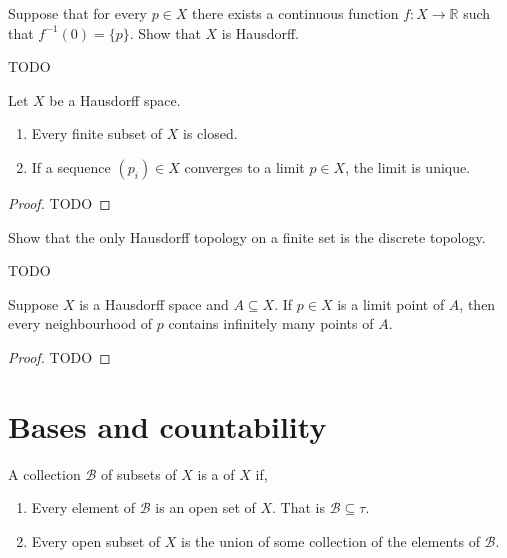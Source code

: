 \begin{exercise}
	\begin{problem}
	Suppose that for every $ p \in X $ there exists a continuous function $ f:X \to \mathbb{R} $ such that $ f ^{-1}( 0 ) = \{ p \} $. Show that $ X $ is Hausdorff.
	\end{problem}
	\begin{solution}
		TODO
	\end{solution}
\end{exercise}

\begin{proposition}
	Let $ X $ be a Hausdorff space.
	\begin{enumerate}
		\item Every finite subset of $ X $ is closed.
		\item If a sequence $ ( p_{i} )\in X $ converges to a limit $ p \in X $, the limit is unique.
	\end{enumerate}
	\begin{proof}
		TODO
	\end{proof}
\end{proposition}

\begin{exercise}
	\begin{problem}
	Show that the only Hausdorff topology on a finite set is the discrete topology.
	\end{problem}
	\begin{solution}
		TODO
	\end{solution}
\end{exercise}

\begin{proposition}
	Suppose $ X $ is a Hausdorff space and $ A \subseteq X $. If $ p \in X $ is a limit point of $ A $, then every neighbourhood of $ p $ contains infinitely many points of $ A $.
	\begin{proof}
		TODO
	\end{proof}
\end{proposition}

\section{Bases and countability}
\begin{definition}[Basis]
	A collection $ \mathcal{B} $ of subsets of $ X $ is a  of $ X $ if,
	\begin{enumerate}
		\item Every element of $ \mathcal{B} $ is an open set of $ X $. That is $ \mathcal{B} \subseteq \tau $.
		\item Every open subset of $ X $ is the union of some collection of the elements of $ \mathcal{B} $.
	\end{enumerate}
\end{definition}

